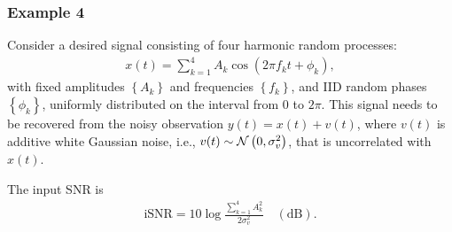 \documentclass[10pt,pdflatex,headrule,landscape]{beamer}
\begin{document}
\begin{frame}
 \frametitle{Example 4}

Consider a desired signal consisting of four harmonic random processes:
\begin{eqnarray*}
 x(t)= \sum_{k=1}^4 A_k\cos\left(2\pi f_k t+\phi_k\right),
\end{eqnarray*}
with fixed amplitudes $\left\{A_k\right\}$ and frequencies $\left\{f_k\right\}$, and IID random phases $\left\{\phi_k\right\}$, uniformly distributed on the interval from $0$ to $2\pi$. This signal needs to be recovered from the noisy observation $y(t)=x(t)+v(t)$, where $v(t)$ is additive white Gaussian noise, i.e., $v(t)\sim {\cal N}\left(0,\sigma_v^2\right)$, that is uncorrelated with $x(t)$.

The input SNR is
\begin{eqnarray*}
\mathrm{iSNR} = 10 \log\frac{\sum_{k=1}^4 A_k^2}{2 \sigma_v^2}\quad \mathrm{(dB)} .
\end{eqnarray*}

\end{frame}
\end{document}
